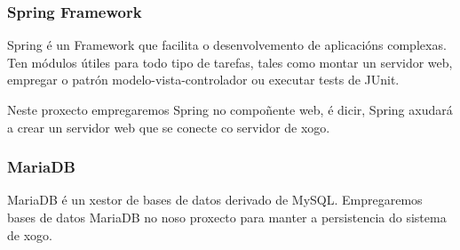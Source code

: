\subsubsection{Spring Framework}
Spring é un Framework que facilita o desenvolvemento de aplicacións complexas.
Ten módulos útiles para todo tipo de tarefas, tales como montar un servidor web,
empregar o patrón modelo-vista-controlador ou executar tests de JUnit.
\par
Neste proxecto empregaremos Spring no compoñente web, é dicir, Spring axudará a
crear un servidor web que se conecte co servidor de xogo.

\subsubsection{MariaDB}
MariaDB é un xestor de bases de datos derivado de MySQL. Empregaremos bases de
datos MariaDB no noso proxecto para manter a persistencia do sistema de xogo.
